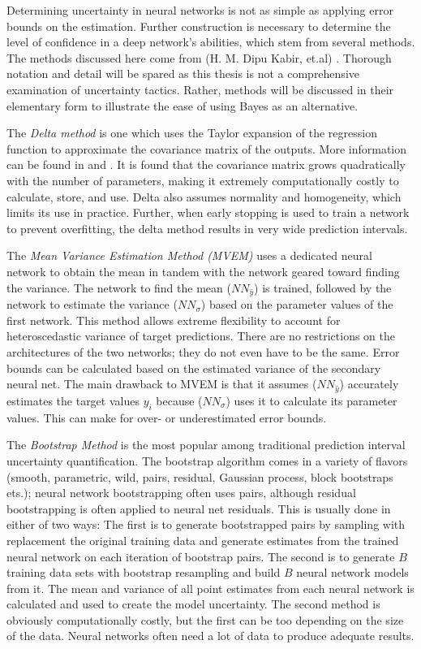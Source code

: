 Determining uncertainty in neural networks is not as simple as applying error bounds on the estimation.  Further construction is necessary to determine the level of confidence in a deep network's abilities, which stem from several methods.  The methods discussed here come from (H. M. Dipu Kabir, et.al) \cite{8371683}.  Thorough notation and detail will be spared as this thesis is not a comprehensive examination of uncertainty tactics.  Rather, methods will be discussed in their elementary form to illustrate the ease of using Bayes as an alternative.

The \textit{Delta method} is one which uses the Taylor expansion of the regression function to approximate the covariance matrix of the outputs.  More information can be found in \cite{nilsen2022epistemic} and \cite{hwang1997prediction}.  It is found that the covariance matrix grows quadratically with the number of parameters, making it extremely computationally costly to calculate, store, and use.  Delta also assumes normality and homogeneity, which limits its use in practice.  Further, when early stopping is used to train a network to prevent overfitting, the delta method results in very wide prediction intervals.

The \textit{Mean Variance Estimation Method (MVEM)} uses a dedicated neural network to obtain the mean in tandem with the network geared toward finding the variance.  The network to find the mean ($NN_{\hat{y}}$) is trained, followed by the network to estimate the variance ($NN_{\sigma}$) based on the parameter values of the first network.  This method allows extreme flexibility to account for heteroscedastic variance of target predictions.  There are no restrictions on the architectures of the two networks; they do not even have to be the same.  Error bounds can be calculated based on the estimated variance of the secondary neural net.  The main drawback to MVEM is that it assumes ($NN_{\hat{y}}$) accurately estimates the target values $y_i$ because ($NN_{\sigma}$) uses it to calculate its parameter values.  This can make for over- or underestimated error bounds.

The \textit{Bootstrap Method} is the most popular among traditional prediction interval uncertainty quantification.  The bootstrap algorithm comes in a variety of flavors (smooth,
parametric, wild, pairs, residual, Gaussian process, block
bootstraps ets.); neural network bootstrapping often uses pairs, although residual bootstrapping is often applied to neural net residuals.  This is usually done in either of two ways:  The first is to generate bootstrapped pairs by sampling with replacement the original training data and generate estimates from the trained neural network on each iteration of bootstrap pairs.  The second is to generate $B$ training data sets with bootstrap resampling and build $B$ neural network models from it.  The mean and variance of all point estimates from each neural network is calculated and used to create the model uncertainty.  The second method is obviously computationally costly, but the first can be too depending on the size of the data.  Neural networks often need a lot of data to produce adequate results.


